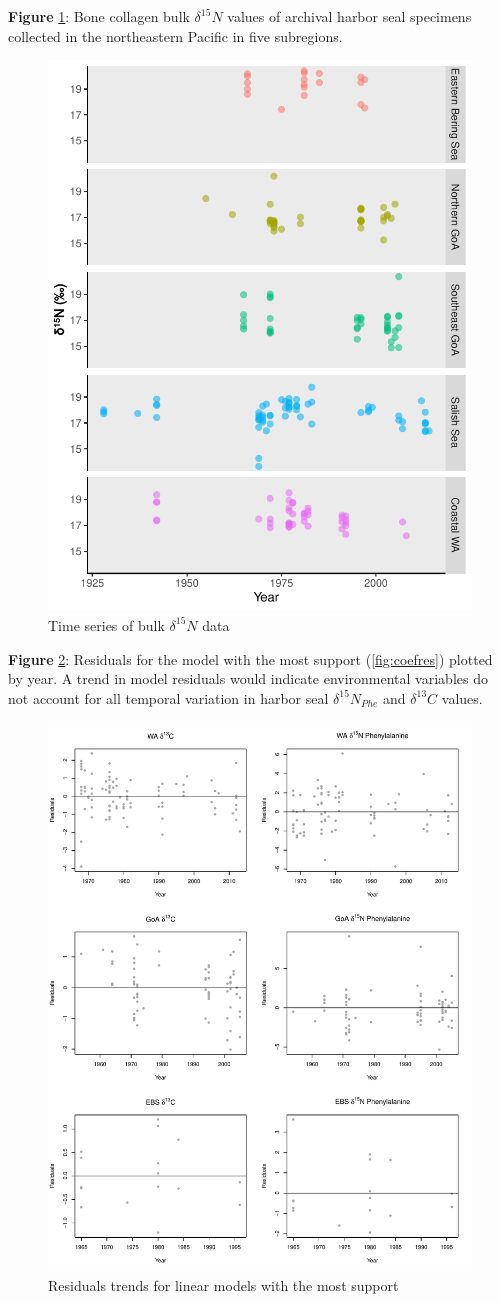 \documentclass [11pt, proquest] {uwthesis}[2015/03/03]
\begin{document}
\textbf{Figure} \ref{fig:bulkN}: Bone collagen bulk \(\delta^{15}N\)
values of archival harbor seal specimens collected in the northeastern
Pacific in five subregions. \newline 
\begin{figure}[h]
\centering
  \includegraphics[height=0.8\textwidth]{figure/Ch2/FigureS6.pdf}
  \caption{Time series of bulk $\delta^{15}N$ data}
  \label{fig:bulkN}
\end{figure}
\clearpage

\textbf{Figure} \ref{fig:linresid}: Residuals for the model with the
most support (\ref{fig:coefres}) plotted by year. A trend in model
residuals would indicate environmental variables do not account for all
temporal variation in harbor seal \(\delta^{15}N_{Phe}\) and
\(\delta^{13}C\) values. \newline 
\begin{figure}[h]
\centering
  \includegraphics[height=0.85\textwidth]{figure/Ch2/FigureS7.pdf}
  \caption{Residuals trends for linear models with the most support}
  \label{fig:linresid}
\end{figure}
\clearpage
\end{document}
